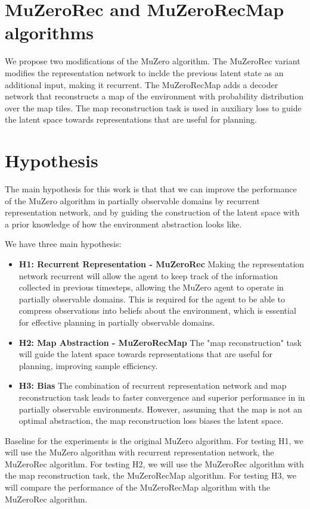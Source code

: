 \documentclass[12pt]{article}
\begin{document}
\section{MuZeroRec and MuZeroRecMap algorithms}
We propose two modifications of the MuZero algorithm. The MuZeroRec variant modifies the representation network to inclde the previous latent state as an additional input, making it recurrent. The MuZeroRecMap adds a decoder network that reconstructs a map of the environment with probability distribution over the map tiles. The map reconstruction task is used in auxiliary loss to guide the latent space towards representations that are useful for planning.  


\section{Hypothesis}
The main hypothesis for this work is that that we can improve the performance of the MuZero algorithm in partially observable domains by recurrent representation network, and by guiding the construction of the latent space with a prior knowledge of how the environment abstraction looks like.

We have three main hypothesis:
\begin{itemize}
    \item \textbf{H1: Recurrent Representation - MuZeroRec} Making the representation network recurrent will allow the agent to keep track of the information collected in previous timesteps, allowing the MuZero agent to operate in partially observable domains. This is required for the agent to be able to compress observations into beliefs about the environment, which is essential for effective planning in partially observable domains.
    \item \textbf{H2: Map Abstraction - MuZeroRecMap} The "map reconstruction" task will guide the latent space towards representations that are useful for planning, improving sample efficiency.
    \item \textbf{H3: Bias} The combination of recurrent representation network and map reconstruction task leads to faster convergence and superior performance in in partially observable environments. However, assuming that the map is not an optimal abstraction, the map reconstruction loss biases the latent space. 
\end{itemize}

Baseline for the experiments is the original MuZero algorithm. For testing H1, we will use the MuZero algorithm with recurrent representation network, the MuZeroRec algorithm. For testing H2, we will use the MuZeroRec algorithm with the map reconstruction task, the MuZeroRecMap algorithm. For testing H3, we will compare the performance of the MuZeroRecMap algorithm with the MuZeroRec algorithm. 
\end{document}
